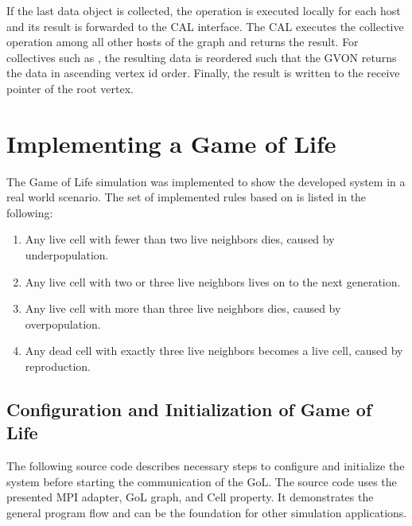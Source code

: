 \noindent If the last data object is collected, the
operation is executed locally for each host and its result is forwarded to the CAL
interface. The CAL executes the collective operation among all
other hosts of the graph and returns the result. For collectives such as
, the resulting data is reordered such that the GVON returns the
data in ascending vertex id order. Finally, the result is written to the receive
pointer of the root vertex.



\section{Implementing a Game of Life}
\label{sec:impl:gol}
The Game of Life simulation was implemented to show the developed
system in a real world scenario. The set of implemented rules based on
\cite{ref:gol_rules} is listed in the following:

\begin{enumerate}
\item Any live cell with fewer than two live neighbors dies, caused by underpopulation.
\item Any live cell with two or three live neighbors lives on to the next generation.
\item Any live cell with more than three live neighbors dies, caused by overpopulation.
\item Any dead cell with exactly three live neighbors becomes a live cell, caused by reproduction.
\end{enumerate}

\subsection{Configuration and Initialization of Game of Life}
The following source code describes necessary steps to configure and
initialize the system before starting the communication of the
GoL. The source code uses the presented MPI adapter, GoL graph, and
Cell property. It demonstrates the general program flow and can be the
foundation for other simulation applications.


